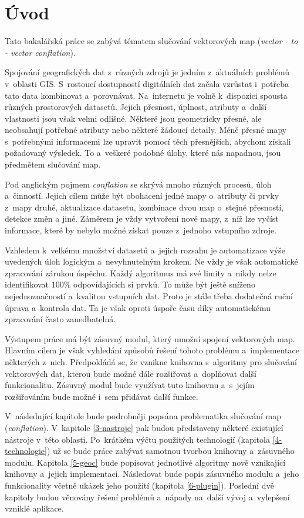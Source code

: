\chapter{Úvod}
\label{1-uvod}

Tato bakalářská práce se zabývá tématem slučování vektorových map
(\textit{vector - to - vector conflation}).

Spojování geografických dat z~různých zdrojů je jedním z~aktuálních
problémů v~oblasti GIS. S~rostoucí dostupností digitálních dat začala
vzrůstat i~potřeba tato data kombinovat a~porovnávat. Na~internetu
je volně k~dispozici spousta různých prostorových datasetů. Jejich
přesnost, úplnost, atributy a~další vlastnosti jsou však velmi odlišné.
Některé jsou geometricky přesné, ale neobsahují potřebné atributy nebo
některé žádoucí detaily. Méně přesné mapy s~potřebnými informacemi
lze upravit pomocí těch přesnějších, abychom získali požadovaný
výsledek. To a~veškeré podobné úlohy, které nás napadnou, jsou 
předmětem slučování map.

Pod anglickým pojmem \textit{conflation} se skrývá mnoho různých
procesů, úloh a~činností. Jejich cílem může být obohacení jedné 
mapy o~atributy či prvky z~mapy druhé, aktualizace datasetu, kombinace 
dvou map o~stejné přesnosti, detekce změn a jiné. Záměrem je vždy 
vytvoření nové mapy, z~níž lze vyčíst informace, které by nebylo možné
získat pouze z~jednoho vstupního zdroje.

Vzhledem k~velkému množství datasetů a~jejich rozsahu je automatizace
výše uvedených úloh logickým a~nevyhnutelným krokem. Ne vždy je však
automatické zpracování zárukou úspěchu. Každý algoritmus má své limity
a~nikdy nelze identifikovat $100\%$ odpovídajících si prvků. To může
být ještě sníženo nejednoznačností a~kvalitou vstupních dat. Proto
je stále třeba dodatečná ruční úprava a~kontrola dat. Ta je však
oproti úspoře času díky automatickému zpracování často zanedbatelná.

Výstupem práce má být zásuvný modul, který umožní spojení
vektorových map. Hlavním cílem je však vyhledání způsobů
řešení tohoto problému a~implementace některých z~nich.
Předpokládá se, že vznikne knihovna s~algoritmy pro slučování
vektorových dat, kterou bude možné dále rozšiřovat a~doplňovat
další funkcionalitu. Zásuvný modul bude využívat tuto knihovnu
a~s~jejím rozšiřováním bude možné i~sem přidávat další funkce.   

V~následující kapitole bude podrobněji popsána problematika 
slučování map (\textit{conflation}). V~kapitole \ref{3-nastroje}
pak budou představeny některé existující nástroje v~této oblasti.
Po~krátkém výčtu použitých technologií (kapitola \ref{4-technologie})
už se bude práce zabývat samotnou tvorbou knihovny a~zásuvného
modulu. Kapitola \ref{5-geoc} bude popisovat jednotlivé algoritmy
nově vznikající knihovny a~jejich implementaci. Následovat
bude popis zásuvného modulu a~jeho funkcionality včetně
ukázek jeho použití (kapitola \ref{6-plugin}). Poslední dvě kapitoly
budou věnovány řešení problémů a~nápady na~další vývoj 
a~vylepšení vzniklé aplikace.  